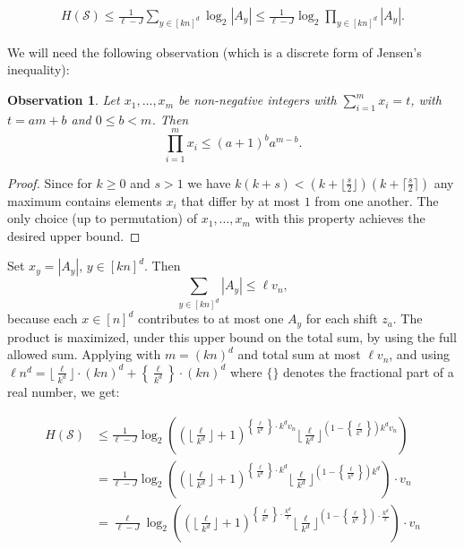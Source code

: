 \documentclass{article}
\newtheorem{observation}[theorem]{Observation}
\begin{document}
\begin{align}\label{eq : entropy A set bound}
    H(\mathcal S)
    \le \frac{1}{\ell-J}\sum_{y\in[kn]^d}\log_2|A_y|
    \le \frac{1}{\ell-J}\log_2\prod_{y\in[kn]^d}|A_y|.
\end{align}


\noindent We will need the following observation (which is a discrete form of Jensen's inequality):

\begin{observation}\label{obs : discrete jensen}
    Let $x_1,\ldots ,x_m$ be non-negative integers with $\sum_{i=1}^m x_i = t$, with $t=am+b$ and \(0\le b<m\). Then
    \[
        \prod_{i=1}^m x_i\le (a+1)^b a^{m-b}.
    \]
\end{observation}

\begin{proof}
    Since for $k\geq 0$ and $s>1$ we have $k(k+s)<(k+\lfloor \frac{s}{2} \rfloor) (k+\lceil \frac{s}{2} \rceil)$ any maximum contains elements $x_i$ that differ by at most $1$ from one another. The only choice (up to permutation) of $x_1,\ldots ,x_m$ with this property achieves the desired upper bound.
\end{proof}



\noindent Set \(x_y=|A_y|\), \(y\in[kn]^d\). Then
\[
    \sum_{y\in[kn]^d}|A_y|\le \ell v_n,
\]
because each \(x\in[n]^d\) contributes to at most one \(A_y\) for each shift \(z_a\). The product is maximized, under this upper bound on the total sum, by using the full allowed sum. Applying  with \(m=(kn)^d\) and total sum at most \(\ell v_n\), and using $\ell n^d = \lfloor \frac{\ell}{k^d} \rfloor \cdot (kn)^d + \left\{ \frac{\ell}{k^d} \right\} \cdot (kn)^d$ where $\{\}$ denotes the fractional part of a real number, we get:

\begin{align}
    H(\mathcal S) &\leq \frac{1}{\ell-J} \log_2 \left( \left(\Bigg\lfloor \frac{\ell}{k^d} \Bigg\rfloor+1 \right)^{\left\{ \frac{\ell}{k^d} \right\} \cdot k^d v_n} \Bigg\lfloor \frac{\ell}{k^d} \Bigg\rfloor^{(1-\left\{ \frac{\ell}{k^d} \right\})k^d v_n} \right) \\
    &= \frac{1}{\ell-J} \log_2 \left( \left(\Bigg\lfloor \frac{\ell}{k^d} \Bigg\rfloor+1 \right)^{\left\{ \frac{\ell}{k^d} \right\} \cdot k^d} \Bigg\lfloor \frac{\ell}{k^d} \Bigg\rfloor^{(1-\left\{ \frac{\ell}{k^d} \right\})k^d} \right)\cdot v_n \\
    &= \frac{\ell}{\ell-J} \log_2 \left( \left(\Bigg\lfloor \frac{\ell}{k^d} \Bigg\rfloor+1 \right)^{\left\{ \frac{\ell}{k^d} \right\} \cdot \frac{k^d}{\ell}} \Bigg\lfloor \frac{\ell}{k^d} \Bigg\rfloor^{(1-\left\{ \frac{\ell}{k^d} \right\}) \cdot \frac{k^d}{\ell}} \right)\cdot v_n \label{eq : fractional quantity}
\end{align}
\end{document}
